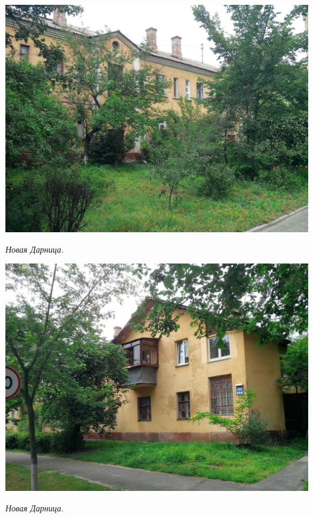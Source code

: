 \newpage
\begin{center}
\includegraphics[width=\linewidth]{lpix/IMG_20160613_143545.jpg}

\textit{Новая Дарница.}
\end{center}


\begin{center}
\includegraphics[width=\linewidth]{lpix/IMG_20160613_143641.jpg}

\textit{Новая Дарница.}
\end{center}
\newpage


